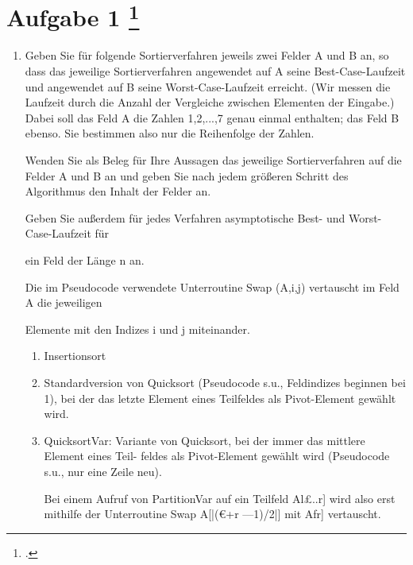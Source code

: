 \documentclass{lehramt-informatik-aufgabe}
\begin{document}
\section{Aufgabe 1
\footcite{66115:2021:03}}

\begin{enumerate}


\item Geben Sie für folgende Sortierverfahren jeweils zwei Felder A und
B an, so dass das jeweilige Sortierverfahren angewendet auf A seine
Best-Case-Laufzeit und angewendet auf B seine Worst-Case-Laufzeit
erreicht. (Wir messen die Laufzeit durch die Anzahl der Vergleiche
zwischen Elementen der Eingabe.) Dabei soll das Feld A die Zahlen
1,2,...,7 genau einmal enthalten; das Feld B ebenso. Sie bestimmen also
nur die Reihenfolge der Zahlen.

Wenden Sie als Beleg für Ihre Aussagen das jeweilige Sortierverfahren
auf die Felder A und B an und geben Sie nach jedem größeren Schritt des
Algorithmus den Inhalt der Felder an.

Geben Sie außerdem für jedes Verfahren asymptotische Best- und
Worst-Case-Laufzeit für

ein Feld der Länge n an.

Die im Pseudocode verwendete Unterroutine Swap (A,i,j) vertauscht im
Feld A die jeweiligen

Elemente mit den Indizes i und j miteinander.
\begin{enumerate}


\item Insertionsort



\item Standardversion von Quicksort (Pseudocode s.u., Feldindizes beginnen bei 1), bei der
das letzte Element eines Teilfeldes als Pivot-Element gewählt wird.


\item QuicksortVar: Variante von Quicksort, bei der immer das mittlere Element eines Teil-
feldes als Pivot-Element gewählt wird (Pseudocode s.u., nur eine Zeile neu).

Bei einem Aufruf von PartitionVar auf ein Teilfeld Al£..r] wird also erst mithilfe der
Unterroutine Swap A[|(€+r —1)/2|] mit Afr] vertauscht.


\end{enumerate}
\end{enumerate}
\end{document}
